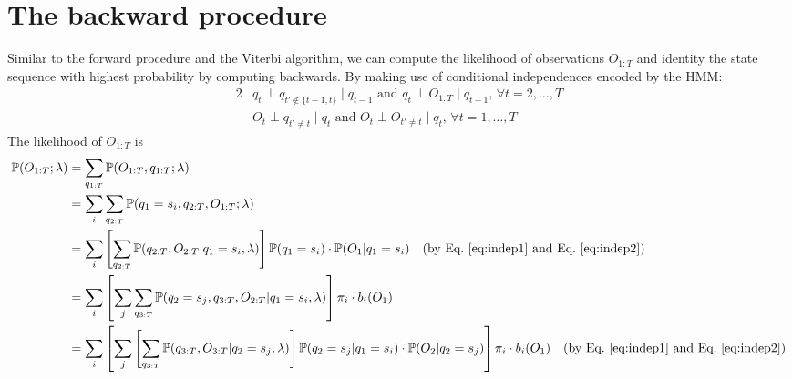 \section{The backward procedure}
\label{sec:backward}

Similar to the forward procedure and the Viterbi algorithm, 
we can compute the likelihood of observations $O_{1:T}$ and identity the state sequence with highest probability by computing backwards.
By making use of conditional independences encoded by the HMM:
\begin{alignat}{2}
& q_t \perp q_{t' \notin \{t-1,t\}} \mid q_{t-1} \text{~and~} q_t \perp O_{1:T} \mid q_{t-1}, \, \forall t=2,\dots,T  \label{eq:indep1} \\
& O_t \perp q_{t' \ne t} \mid q_t \text{~and~} O_t \perp O_{t' \ne t} \mid q_t, \, \forall t=1,\dots,T                \label{eq:indep2}
\end{alignat}
The likelihood of $O_{1:T}$ is 
\begin{align*}
\mathbb{P}(O_{1:T} ;\lambda) 
&= \sum_{q_{1:T}} \mathbb{P}(O_{1:T},q_{1:T} ;\lambda) \\
&= \sum_{i} \sum_{q_{2:T}} \mathbb{P}(q_1 = s_i, q_{2:T}, O_{1:T} ;\lambda) \\
&= \sum_{i} \left[ \sum_{q_{2:T}} \mathbb{P}(q_{2:T}, O_{2:T} |q_1 = s_i, \lambda) \right] \mathbb{P}(q_1 = s_i) \cdot \mathbb{P}(O_1 |q_1 = s_i) 
   ~~~ \text{(by Eq.~\ref{eq:indep1} and Eq.~\ref{eq:indep2})} \\
&= \sum_{i} \left[ \sum_{j} \sum_{q_{3:T}} \mathbb{P}(q_2 = s_j, q_{3:T}, O_{2:T} |q_1 = s_i, \lambda) \right] \pi_i \cdot b_i(O_1) \\
&= \sum_{i} \left[ \sum_{j} \left[ \sum_{q_{3:T}} \mathbb{P}(q_{3:T}, O_{3:T} |q_2 = s_j, \lambda) \right] \mathbb{P}(q_2 = s_j |q_1 = s_i) \cdot \mathbb{P}(O_2 |q_2 = s_j) 
   \right] \pi_i \cdot b_i(O_1) 
   ~~~ \text{(by Eq.~\ref{eq:indep1} and Eq.~\ref{eq:indep2})}
\end{align*}


